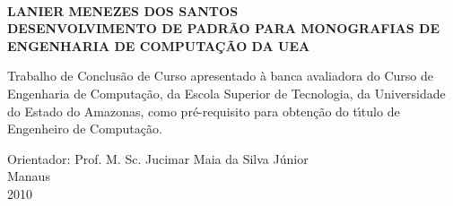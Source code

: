 \thispagestyle{empty}
\begin{center}
	\textbf{\\[4em]LANIER MENEZES DOS SANTOS \\[5cm]}
	\textbf{DESENVOLVIMENTO DE PADR\~{A}O PARA MONOGRAFIAS DE ENGENHARIA DE COMPUTA\c{C}\~{A}O DA UEA\\[96pt]}
\end{center}
\hspace*{8cm}
\begin{minipage}{8cm} 
	Trabalho de Conclus\~{a}o de Curso apresentado \`{a} banca avaliadora do Curso de Engenharia de Computa\c{c}\~{a}o, da 
	Escola Superior de Tecnologia, da Universidade do Estado do Amazonas, como
	pr\'e-requisito para obten\c{c}\~{a}o do t\'{\i}tulo de Engenheiro de Computa\c{c}\~{a}o.\\[50pt] 
\end{minipage} 
\begin{center}
	Orientador: Prof. M. Sc. Jucimar Maia da Silva J\'{u}nior\\[4ex]
	\normalsize Manaus\\
	\normalsize 2010
\end{center}